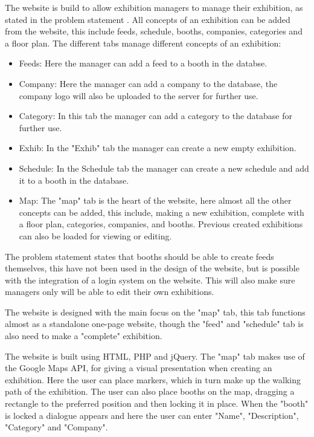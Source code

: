 The website is build to allow exhibition managers to manage their exhibition, as stated in the problem statement . All concepts of an exhibition can be added from the website, this include feeds, schedule, booths, companies, categories and a floor plan.
The different tabs manage different concepts of an exhibition:


\begin{itemize}
	\item Feeds: Here the manager can add a feed to a booth in the databse.
	\item Company: Here the manager can add a company to the database, the company logo will also be uploaded to the server for further use.
	\item Category: In this tab the manager can add a category to the database for further use.
	\item Exhib: In the "Exhib" tab the manager can create a new empty exhibition.
	\item Schedule: In the Schedule tab the manager can create a new schedule and add it to a booth in the database.
	\item Map: The "map" tab is the heart of the website, here almost all the other concepts can be added, this include, making a new exhibition, complete with a floor plan, categories, companies, and booths. Previous created exhibitions can also be loaded for viewing or editing.
\end{itemize}


The problem statement  states that booths should be able to create feeds themselves, this have not been used in the design of the website, but is possible with the integration of a login system on the website. This will also make sure managers only will be able to edit their own exhibitions.


The website is designed with the main focus on the "map" tab, this tab functions almost as a standalone one-page website, though the "feed" and "schedule" tab is also need to make a "complete" exhibition.


The website is built using HTML, PHP and jQuery. The "map" tab makes use of the Google Maps API, for giving a visual presentation when creating an exhibition.
Here the user can place markers, which in turn make up the walking path of the exhibition. The user can also place booths on the map, dragging a rectangle to the preferred position and then locking it in place. When the "booth" is locked a dialogue appears and here the user can enter "Name", "Description", "Category" and "Company".


